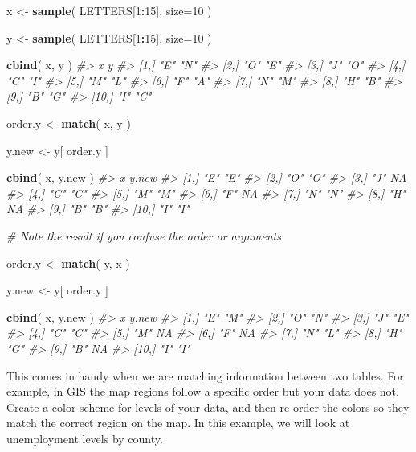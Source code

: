 \documentclass[]{book}
\newenvironment{Shaded}{\begin{snugshade}}{\end{snugshade}}
\newcommand{\CommentTok}[1]{\textcolor[rgb]{0.56,0.35,0.01}{\textit{#1}}}
\newcommand{\DataTypeTok}[1]{\textcolor[rgb]{0.13,0.29,0.53}{#1}}
\newcommand{\DecValTok}[1]{\textcolor[rgb]{0.00,0.00,0.81}{#1}}
\newcommand{\KeywordTok}[1]{\textcolor[rgb]{0.13,0.29,0.53}{\textbf{#1}}}
\newcommand{\NormalTok}[1]{#1}
\newcommand{\OperatorTok}[1]{\textcolor[rgb]{0.81,0.36,0.00}{\textbf{#1}}}
\newcommand{\StringTok}[1]{\textcolor[rgb]{0.31,0.60,0.02}{#1}}
\theoremstyle{definition}
\theoremstyle{definition}
\theoremstyle{definition}
\theoremstyle{remark}
\begin{document}
\begin{Shaded}
\begin{Highlighting}[]

\NormalTok{x <-}\StringTok{ }\KeywordTok{sample}\NormalTok{( LETTERS[}\DecValTok{1}\OperatorTok{:}\DecValTok{15}\NormalTok{], }\DataTypeTok{size=}\DecValTok{10}\NormalTok{ )}

\NormalTok{y <-}\StringTok{ }\KeywordTok{sample}\NormalTok{( LETTERS[}\DecValTok{1}\OperatorTok{:}\DecValTok{15}\NormalTok{], }\DataTypeTok{size=}\DecValTok{10}\NormalTok{ )}

\KeywordTok{cbind}\NormalTok{( x, y )}
\CommentTok{#>       x   y  }
\CommentTok{#>  [1,] "E" "N"}
\CommentTok{#>  [2,] "O" "E"}
\CommentTok{#>  [3,] "J" "O"}
\CommentTok{#>  [4,] "C" "I"}
\CommentTok{#>  [5,] "M" "L"}
\CommentTok{#>  [6,] "F" "A"}
\CommentTok{#>  [7,] "N" "M"}
\CommentTok{#>  [8,] "H" "B"}
\CommentTok{#>  [9,] "B" "G"}
\CommentTok{#> [10,] "I" "C"}

\NormalTok{order.y <-}\StringTok{ }\KeywordTok{match}\NormalTok{( x, y )}

\NormalTok{y.new <-}\StringTok{ }\NormalTok{y[ order.y ]}

\KeywordTok{cbind}\NormalTok{( x, y.new )}
\CommentTok{#>       x   y.new}
\CommentTok{#>  [1,] "E" "E"  }
\CommentTok{#>  [2,] "O" "O"  }
\CommentTok{#>  [3,] "J" NA   }
\CommentTok{#>  [4,] "C" "C"  }
\CommentTok{#>  [5,] "M" "M"  }
\CommentTok{#>  [6,] "F" NA   }
\CommentTok{#>  [7,] "N" "N"  }
\CommentTok{#>  [8,] "H" NA   }
\CommentTok{#>  [9,] "B" "B"  }
\CommentTok{#> [10,] "I" "I"}


\CommentTok{# Note the result if you confuse the order or arguments}

\NormalTok{order.y <-}\StringTok{ }\KeywordTok{match}\NormalTok{( y, x )}

\NormalTok{y.new <-}\StringTok{ }\NormalTok{y[ order.y ]}

\KeywordTok{cbind}\NormalTok{( x, y.new )}
\CommentTok{#>       x   y.new}
\CommentTok{#>  [1,] "E" "M"  }
\CommentTok{#>  [2,] "O" "N"  }
\CommentTok{#>  [3,] "J" "E"  }
\CommentTok{#>  [4,] "C" "C"  }
\CommentTok{#>  [5,] "M" NA   }
\CommentTok{#>  [6,] "F" NA   }
\CommentTok{#>  [7,] "N" "L"  }
\CommentTok{#>  [8,] "H" "G"  }
\CommentTok{#>  [9,] "B" NA   }
\CommentTok{#> [10,] "I" "I"}
\end{Highlighting}
\end{Shaded}

This comes in handy when we are matching information between two tables.
For example, in GIS the map regions follow a specific order but your
data does not. Create a color scheme for levels of your data, and then
re-order the colors so they match the correct region on the map. In this
example, we will look at unemployment levels by county.
\end{document}
